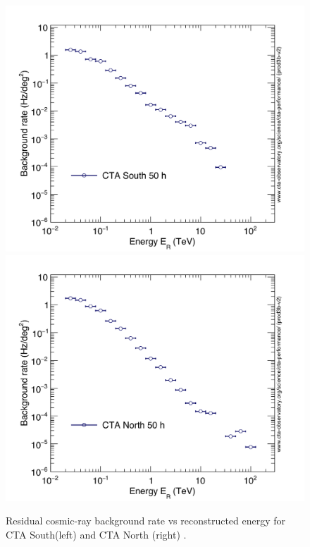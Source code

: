 \documentclass[main.tex]{subfiles}
\begin{document}
\begin{itemize}
  \begin{figure}[!htb]
    \includegraphics[width=\linewidth]{Pictures/CTA-Performance-prod3b-v2-South-20deg-BackgroundRateSquDeg.pdf}
    \endminipage\hfill
    \includegraphics[width=\linewidth]{Pictures/CTA-Performance-prod3b-v2-North-20deg-BackgroundRateSquDeg.pdf}
    \endminipage\hfill
    \caption{\label{fig:bkgrate} Residual cosmic-ray background rate vs reconstructed energy for CTA South(left) and CTA North (right) \cite{CTAPerformance}.}
  \end{figure}


\end{itemize}
\end{document}
